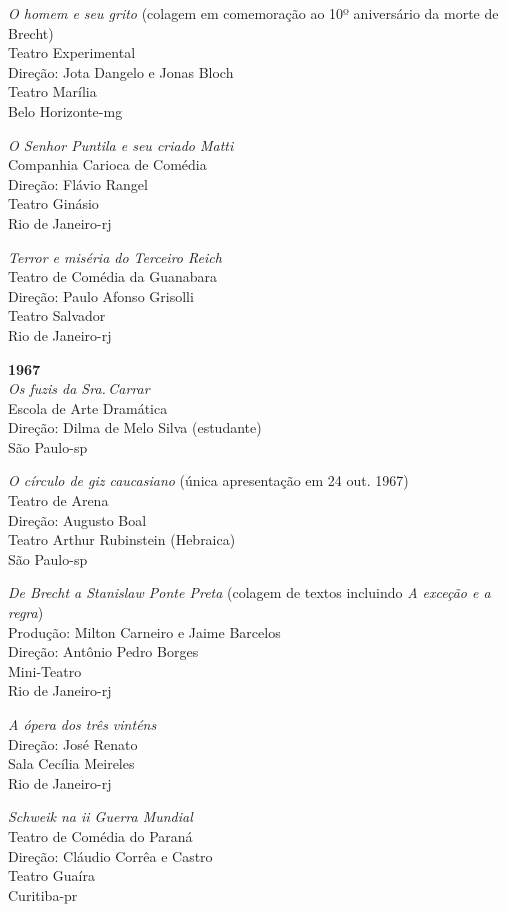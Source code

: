 {\it O homem e seu grito} (colagem em comemoração ao 10º aniversário da
morte de Brecht)\\
Teatro Experimental\\
Direção: Jota Dangelo e Jonas Bloch\\
Teatro Marília\\
Belo Horizonte-{\sc mg}

{\it O Senhor Puntila e seu criado Matti}\\
Companhia Carioca de Comédia\\
Direção: Flávio Rangel\\
Teatro Ginásio\\
Rio de Janeiro-{\sc rj}

{\it Terror e miséria do Terceiro Reich}\\
Teatro de Comédia da Guanabara\\
Direção: Paulo Afonso Grisolli\\
Teatro Salvador\\
Rio de Janeiro-{\sc rj}

\item{\bf 1967}\\
{\it Os fuzis da Sra.\,Carrar}\\
Escola de Arte Dramática\\
Direção: Dilma de Melo Silva (estudante)\\
São Paulo-{\sc sp}

{\it O círculo de giz caucasiano} (única apresentação em 24 out. 1967)\\
Teatro de Arena\\
Direção: Augusto Boal\\
Teatro Arthur Rubinstein (Hebraica)\\
São Paulo-{\sc sp}

{\it De Brecht a Stanislaw Ponte Preta} (colagem de textos incluindo
{\it A exceção e a regra})\\
Produção: Milton Carneiro e Jaime Barcelos\\
Direção: Antônio Pedro Borges\\
Mini-Teatro\\
Rio de Janeiro-{\sc rj}

{\it A ópera dos três vinténs}\\
Direção: José Renato\\
Sala Cecília Meireles\\
Rio de Janeiro-{\sc rj}

{\it Schweik na {\sc ii} Guerra Mundial}\\
Teatro de Comédia do Paraná\\
Direção: Cláudio Corrêa e Castro\\
Teatro Guaíra\\
Curitiba-{\sc pr}

